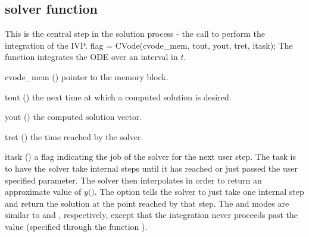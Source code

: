 
\subsection{{\cvode} solver function}\label{sss:cvode}
%
This is the central step in the solution process - the call to perform the integration 
of the IVP.
%
{
  flag = CVode(cvode\_mem, tout, yout, tret, itask);
}
{
  The function  integrates the ODE over an interval in $t$.
}
{
  \begin{args}
  \item[cvode\_mem] ()
    pointer to the {\cvode} memory block.
  \item[tout] ()
    the next time at which a computed solution is desired.
  \item[yout] ()
    the computed solution vector.
  \item[tret] ()
    the time reached by the solver.
  \item[itask] ()
    a flag indicating the job of the solver for the next user step. 
    The  task is to have the solver take internal steps until   
    it has reached or just passed the user specified 
    parameter. The solver then interpolates in order to   
    return an approximate value of $y($$)$. 
    The  option tells the solver to just take one internal step  
    and return the solution at the point reached by that step. 
    The  and  modes are     
    similar to  and , respectively, except    
    that the integration never proceeds past the value      
     (specified through the function ).
  \end{args}
}
